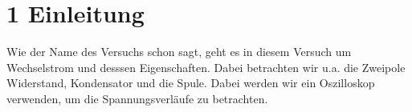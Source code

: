 \chapter*{1 Einleitung}
\setcounter{chapter}{1}
\setcounter{section}{0}
\setcounter{subsection}{0}

Wie der Name des Versuchs schon sagt, geht es in diesem Versuch um Wechselstrom und desssen Eigenschaften. Dabei betrachten wir u.a. die Zweipole Widerstand, Kondensator und die Spule. Dabei werden wir ein Oszilloskop verwenden, um die Spannungsverläufe zu betrachten.\\
